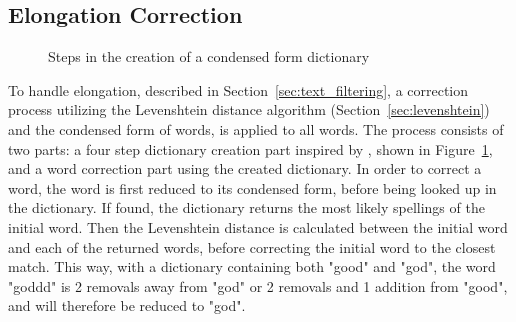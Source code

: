 \subsection*{Elongation Correction}
\begin{figure}[t]
    \caption{Steps in the creation of a condensed form dictionary}
    \label{fig:canonical_dict}
\end{figure}

To handle elongation, described in Section~\ref{sec:text_filtering}, a correction process utilizing the Levenshtein distance algorithm (Section~\ref{sec:levenshtein}) and the condensed form of words, is applied to all words. The process consists of two parts: a four step dictionary creation part inspired by \cite{brody11}, shown in Figure~\ref{fig:canonical_dict}, and a word correction part using the created dictionary. In order to correct a word, the word is first reduced to its condensed form, before being looked up in the dictionary. If found, the dictionary returns the most likely spellings of the initial word. Then the Levenshtein distance is calculated between the initial word and each of the returned words, before correcting the initial word to the closest match. This way, with a dictionary containing both "good" and "god", the word "goddd" is 2 removals away from "god" or 2 removals and 1 addition from "good", and will therefore be reduced to "god".

